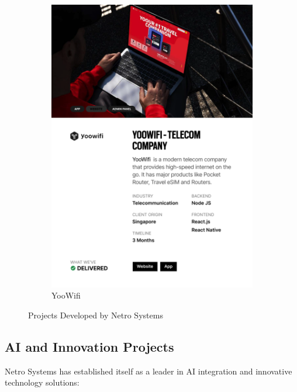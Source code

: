 \documentclass[12pt,a4paper]{report}
\begin{document}
\begin{figure}[h!]
\begin{subfigure}[b]{0.43\textwidth}
    \includegraphics[width=\textwidth]{Figures/yoowifi.png}
    \caption{YooWifi}
\end{subfigure}

\caption{Projects Developed by Netro Systems}
\label{fig:projects_grid}
\end{figure}


\newpage
\subsection{AI and Innovation Projects}
Netro Systems has established itself as a leader in AI integration and innovative technology solutions:
\end{document}

